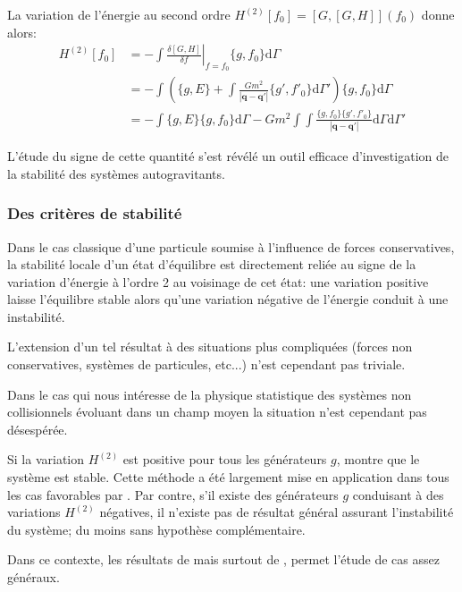 La variation de l'énergie au second ordre
$
	H^{(2)} [f_{0}] = \left[G, [G,H] \right](f_0)
$
donne alors:
\begin{align}
	H^{(2)}[f_{0}]
	& = - \int \left.\frac{\delta [G,H]}{\delta f}\right|_{f=f_{0}} \{g,f_{0}\} \mathrm{d} \Gamma
	\nonumber \\
	& = - \int \left(
		\{g,E\} + \int \frac{Gm^2}{|\mathbf{q}-\mathbf{q'}|}
		\{g',f'_{0}\} \mathrm{d} \Gamma'
	\right) \{g,f_{0}\} \mathrm{d} \Gamma
	\nonumber \\
	& = - \int \{g,E\} \{g,f_{0}\} \mathrm{d} \Gamma
	- G m^2 \int\!\!\!\int \frac{\{g,f_{0}\}\{g',f'_{0}\}}{|\mathbf{q} - \mathbf{q'}|}
	\mathrm{d} \Gamma \mathrm{d} \Gamma'
\end{align}

L'étude du signe de cette quantité s'est révélé un outil efficace d'investigation de la stabilité des systèmes autogravitants.


\subsubsection{Des critères de stabilité}

Dans le cas classique d'une particule soumise à l'influence de forces conservatives, la stabilité locale d'un état d'équilibre est directement reliée
au signe de la variation d'énergie à l'ordre 2 au voisinage de cet état: une variation positive laisse l'équilibre stable alors qu'une variation
négative de l'énergie conduit à une instabilité.

L'extension d'un tel résultat à des situations plus compliquées (forces non conservatives, systèmes de particules, etc...) n'est cependant pas
triviale.

Dans le cas qui nous intéresse de la physique statistique des systèmes non collisionnels évoluant dans un champ moyen la situation n'est cependant pas
désespérée.

Si la variation $H^{(2)}$ est positive pour tous les générateurs $g$, \cite{bartho} montre que le système est stable. Cette méthode a été
largement mise en application dans tous les cas favorables par \cite{perezaly}. Par contre, s'il existe des générateurs $g$
conduisant à des variations $H^{(2)}$ négatives, il n'existe pas de résultat général assurant l'instabilité du système; du moins sans hypothèse
complémentaire.


Dans ce contexte, les résultats de \cite{blochmarsden} mais surtout de \cite{krechet}, permet l'étude de cas assez généraux.

